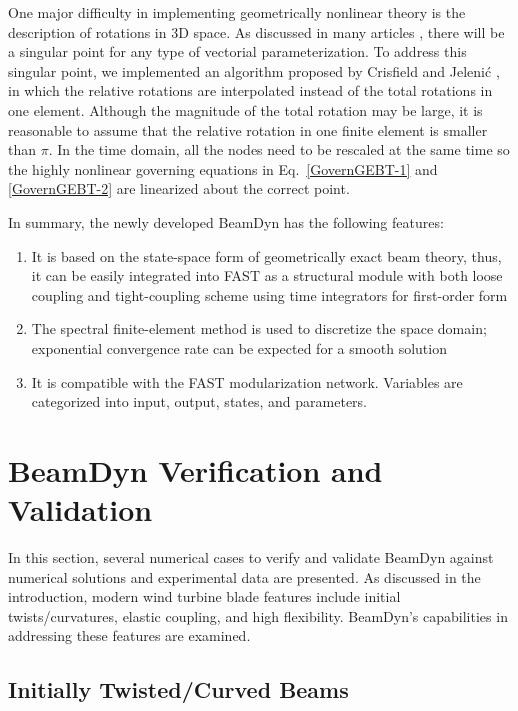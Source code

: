 \documentclass{aiaa-tc}
\begin{document}
One major difficulty in implementing geometrically nonlinear theory is the description of rotations in 3D space. As discussed in many articles \cite{Crisfield:1999,Bauchau:2010,Bottasso:1998}, there will be a singular point for any type of vectorial parameterization. To address this singular point, we implemented an algorithm proposed by Crisfield and Jeleni\'c \cite{Crisfield:1999}, in which the relative rotations are interpolated instead of the total rotations in one element. Although the magnitude of the total rotation may be large, it is reasonable to assume that the relative rotation in one finite element is smaller than $\pi$. In the time domain, all the nodes need to be rescaled at the same time so the highly nonlinear governing equations in Eq.~\eqref{GovernGEBT-1} and \eqref{GovernGEBT-2} are linearized about the correct point.

In summary, the newly developed BeamDyn has the following features: 
\begin{enumerate}
    \item It is based on the state-space form of geometrically exact beam theory, thus, it can be easily integrated into FAST as a structural module with both loose coupling and tight-coupling scheme using time integrators for first-order form
    \item The spectral finite-element method is used to discretize the space domain; exponential convergence rate can be expected for a smooth solution
    \item It is compatible with the FAST modularization network. Variables are categorized into input, output, states, and parameters.
\end{enumerate}

\section{BeamDyn Verification and Validation}
In this section, several numerical cases to verify and validate BeamDyn against numerical solutions and experimental data are presented. As discussed in the introduction, modern wind turbine blade features include initial twists/curvatures, elastic coupling, and high flexibility. BeamDyn's capabilities in addressing these features are examined.

\subsection{Initially Twisted/Curved Beams}
\end{document}
